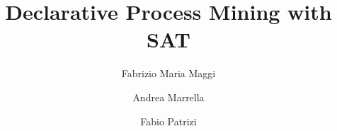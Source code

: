 \documentclass[review]{elsarticle}
\begin{document}
\begin{frontmatter}

\title{Declarative Process Mining with SAT}

\author[1]{Fabrizio Maria Maggi}
\address[1]{Free University of Bozen-Bolzano}

\author[2]{Andrea Marrella}

\author[2]{Fabio Patrizi}

\address[2]{Sapienza University of Rome}



%
%

%




\end{frontmatter}
\end{document}
